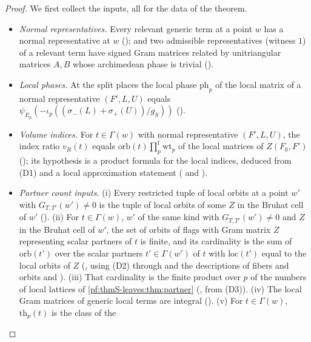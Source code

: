\begin{proof}
We first collect the inputs, all for the data of the theorem.
\begin{itemize}
\item \emph{Normal representatives.} Every relevant generic term at a point $w$ has a normal representative at $w$
(); and two admissible representatives (witness $1$) of a relevant term
have signed Gram matrices related by unitriangular matrices $A,B$ whose archimedean phase is trivial
().
\item \emph{Local phases.} At the split places the local phase $\mathrm{ph}_p$ of the local matrix of a normal representative
$(F',L,U)$ equals $\psi_{E_p}(-\iota_p((\sigma_-(L)+\sigma_+(U))/g_S))$ ().
\item \emph{Volume indices.} For $t\in\Gamma(w)$ with normal representative $(F',L,U)$, the index ratio $v_R(t)$ equals
$\mathrm{orb}(t)\prod^{\mathrm f}_p\mathrm{wt}_p$ of the local matrices of $\widehat Z(F_0,F')$
(); its hypothesis is a product formula for the local indices,
deduced from (D1) and a local approximation statement
( and ).
\item \emph{Partner count inputs.} (i) Every restricted tuple of local orbits at a point $w'$ with $G_{T,T'}(w')\ne0$ is the
tuple of local orbits of some $Z$ in the Bruhat cell of $w'$ (). (ii) For
$t\in\Gamma(w)$, $w'$ of the same kind with $G_{T,T'}(w')\ne0$ and $Z$ in the Bruhat cell of $w'$, the set of orbits of flags with
Gram matrix $Z$ representing scalar partners of $t$ is finite, and its cardinality is the sum of $\mathrm{orb}(t')$ over the
scalar partners $t'\in\Gamma(w')$ of $t$ with $\mathrm{loc}(t')$ equal to the local orbits of $Z$
(, using (D2) through  and
the descriptions of fibers and orbits  and ).
(iii) That cardinality is the finite product over $p$ of the numbers of local lattices of \cref{pf:thmS-leaves:thm:partner}
(, from (D3)). (iv) The local Gram matrices of generic local
terms are integral (). (v) For $t\in\Gamma(w)$, $\mathrm{th}_p(t)$ is the class of the

\end{itemize}
\end{proof}
